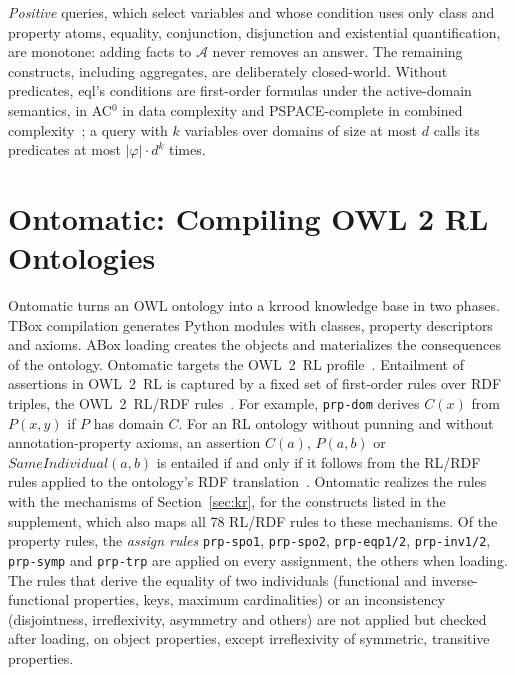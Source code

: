 \documentclass[sigconf,anonymous]{aamas}
\begin{document}
\emph{Positive} queries, which select variables and whose condition uses only class and property atoms, equality, conjunction, disjunction and existential quantification, are monotone: adding facts to $\mathcal{A}$ never removes an answer. The remaining constructs, including aggregates, are deliberately closed-world. Without predicates, \ac{eql}'s conditions are first-order formulas under the active-domain semantics, in AC$^0$ in data complexity and PSPACE-complete in combined complexity~\cite{Vardi1982,immerman1987languages}; a query with $k$ variables over domains of size at most $d$ calls its predicates at most $|\varphi|\cdot d^{k}$ times.

\section{Ontomatic: Compiling OWL 2 RL Ontologies}
\label{sec:ontomatic}

Ontomatic turns an OWL ontology into a \ac{krrood} knowledge base in two phases. TBox compilation generates Python modules with classes, property descriptors and axioms. ABox loading creates the objects and materializes the consequences of the ontology. Ontomatic targets the OWL~2~RL profile~\cite{motik2012owl2profiles}. Entailment of assertions in OWL~2~RL is captured by a fixed set of first-order rules over RDF triples, the OWL~2~RL/RDF rules~\cite[Section~4.3]{motik2012owl2profiles}. For example, \texttt{prp-dom} derives $C(x)$ from $P(x,y)$ if $P$ has domain $C$. For an RL ontology without punning and without annotation-property axioms, an assertion $C(a)$, $P(a,b)$ or $\mathit{SameIndividual}(a,b)$ is entailed if and only if it follows from the RL/RDF rules applied to the ontology's RDF translation~\cite[Theorem PR1]{motik2012owl2profiles}. Ontomatic realizes the rules with the mechanisms of Section~\ref{sec:kr}, for the constructs listed in the supplement, which also maps all 78 RL/RDF rules to these mechanisms. Of the property rules, the \emph{assign rules} \texttt{prp-spo1}, \texttt{prp-spo2}, \texttt{prp-eqp1/2}, \texttt{prp-inv1/2}, \texttt{prp-symp} and \texttt{prp-trp} are applied on every assignment, the others when loading. The rules that derive the equality of two individuals (functional and inverse-functional properties, keys, maximum cardinalities) or an inconsistency (disjointness, irreflexivity, asymmetry and others) are not applied but checked after loading, on object properties, except irreflexivity of symmetric, transitive properties.
\end{document}
